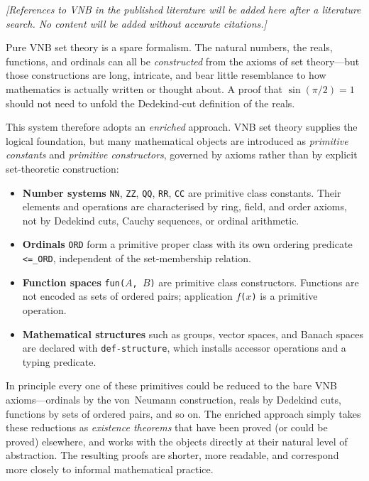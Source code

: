 \documentclass{amsbook}[openany]
\theoremstyle{definition}
\theoremstyle{remark}
\theoremstyle{remark}
\begin{document}
\emph{[References to VNB in the published literature will be added here
after a literature search.  No content will be added without accurate
citations.]}

Pure VNB set theory is a spare formalism.  The natural numbers, the
reals, functions, and ordinals can all be \emph{constructed} from the
axioms of set theory---but those constructions are long, intricate, and
bear little resemblance to how mathematics is actually written or thought
about.  A proof that $\sin(\pi/2) = 1$ should not need to unfold the
Dedekind-cut definition of the reals.

This system therefore adopts an \emph{enriched} approach.  VNB set
theory supplies the logical foundation, but many mathematical objects
are introduced as \emph{primitive constants} and \emph{primitive
constructors}, governed by axioms rather than by explicit
set-theoretic construction:

\begin{itemize}[label = $\circ$, leftmargin= 0.9cm]
\item \textbf{Number systems} \texttt{NN}, \texttt{ZZ}, \texttt{QQ},
  \texttt{RR}, \texttt{CC} are primitive class constants.  Their
  elements and operations are characterised by ring, field, and order
  axioms, not by Dedekind cuts, Cauchy sequences, or ordinal arithmetic.
\item \textbf{Ordinals} \texttt{ORD} form a primitive proper class with
  its own ordering predicate \texttt{<=\_ORD}, independent of the
  set-membership relation.
\item \textbf{Function spaces} \texttt{fun($A$, $B$)} are primitive
  class constructors.  Functions are not encoded as sets of ordered
  pairs; application \texttt{$f$($x$)} is a primitive operation.
\item \textbf{Mathematical structures} such as groups, vector spaces,
  and Banach spaces are declared with \texttt{def-structure}, which
  installs accessor operations and a typing predicate.
\end{itemize}

In principle every one of these primitives could be reduced to the bare
VNB axioms---ordinals by the von~Neumann construction, reals by Dedekind
cuts, functions by sets of ordered pairs, and so on.  The enriched
approach simply takes these reductions as \emph{existence theorems} that
have been proved (or could be proved) elsewhere, and works with the
objects directly at their natural level of abstraction.  The resulting
proofs are shorter, more readable, and correspond more closely to
informal mathematical practice.
\end{document}
